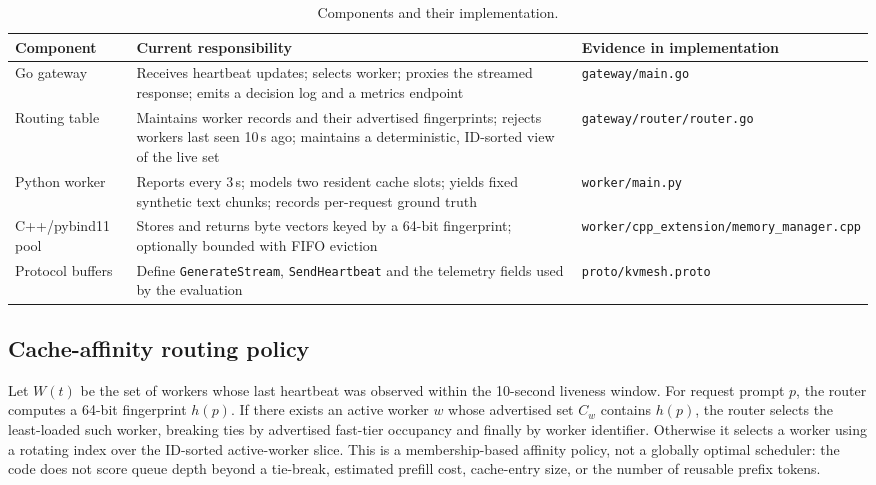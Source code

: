\documentclass[10pt,twocolumn]{article}
\begin{document}
\begin{table}[t]
\centering
\caption{Components and their implementation.}
\label{tab:components}
\setlength{\tabcolsep}{3pt}
\begin{tabular}{p{}p{}p{}}
\toprule
\textbf{Component} & \textbf{Current responsibility} & \textbf{Evidence in implementation} \\
\midrule
Go gateway & Receives heartbeat updates; selects worker; proxies the streamed response; emits a decision log and a metrics endpoint &
\texttt{gateway/\allowbreak main.go} \\
Routing table & Maintains worker records and their advertised fingerprints; rejects workers last seen 10\,s ago; maintains a deterministic, ID-sorted view of the live set &
\texttt{gateway/\allowbreak router/\allowbreak router.go} \\
Python worker & Reports every 3\,s; models two resident cache slots; yields fixed synthetic text chunks; records per-request ground truth &
\texttt{worker/\allowbreak main.py} \\
C++/pybind11 pool & Stores and returns byte vectors keyed by a 64-bit fingerprint; optionally bounded with FIFO eviction &
\texttt{worker/\allowbreak cpp\_extension/\allowbreak memory\_manager.cpp} \\
Protocol buffers & Define \texttt{GenerateStream}, \texttt{SendHeartbeat} and the telemetry fields used by the evaluation &
\texttt{proto/\allowbreak kvmesh.proto} \\
\bottomrule
\end{tabular}
\end{table}

\subsection{Cache-affinity routing policy}

Let $W(t)$ be the set of workers whose last heartbeat was observed within the
10-second liveness window. For request prompt $p$, the router computes a
64-bit fingerprint $h(p)$. If there exists an active worker $w$ whose
advertised set $C_w$ contains $h(p)$, the router selects the
least-loaded such worker, breaking ties by advertised fast-tier occupancy and
finally by worker identifier. Otherwise it selects a worker using a rotating
index over the ID-sorted active-worker slice. This is a membership-based
affinity policy, not a globally optimal scheduler: the code does not score
queue depth beyond a tie-break, estimated prefill cost, cache-entry size, or
the number of reusable prefix tokens.
\end{document}
